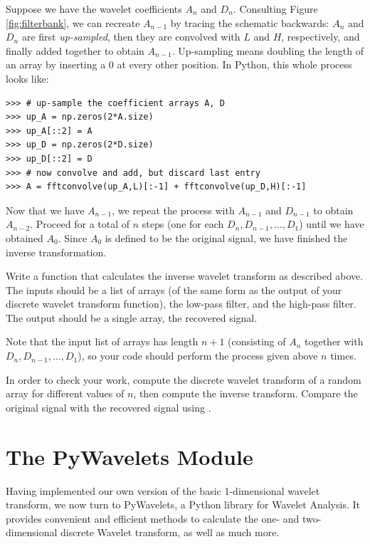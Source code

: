 Suppose we have the wavelet coefficients $A_n$ and $D_n$. Consulting Figure \ref{fig:filterbank},
we can recreate $A_{n-1}$ by tracing the schematic backwards: $A_n$ and $D_n$ are first
\emph{up-sampled}, then they are convolved with $L$ and $H$, respectively, and finally
added together to obtain $A_{n-1}$. Up-sampling means doubling the length of an array
by inserting a 0 at every other position. In Python, this whole process looks like:
\begin{lstlisting}
>>> # up-sample the coefficient arrays A, D
>>> up_A = np.zeros(2*A.size)
>>> up_A[::2] = A
>>> up_D = np.zeros(2*D.size)
>>> up_D[::2] = D
>>> # now convolve and add, but discard last entry
>>> A = fftconvolve(up_A,L)[:-1] + fftconvolve(up_D,H)[:-1]
\end{lstlisting}
Now that we have $A_{n-1}$, we repeat the process with $A_{n-1}$ and $D_{n-1}$ to obtain
$A_{n-2}$. Proceed for a total of $n$ steps (one for each $D_n, D_{n-1},\ldots ,D_1$) until we have obtained $A_0$.
Since $A_0$ is defined to be the original
signal, we have finished the inverse transformation.
\begin{problem}
Write a function that calculates the inverse wavelet transform as described above.
The inputs should be a list of arrays (of the same form as the output of your discrete
wavelet transform function), the low-pass filter, and the high-pass filter.
The output should be a single array, the recovered signal.

Note that the input list of arrays has length $n+1$ (consisting of $A_n$ together with
$D_n, D_{n-1}, \ldots, D_1$), so your code should perform the process given above $n$ times.

In order to check your work, compute
the discrete wavelet transform of a random array for different values of $n$, then compute the inverse
transform.
Compare the original signal with the recovered signal using .
\end{problem}
\section*{The PyWavelets Module}
Having implemented our own version of the basic 1-dimensional wavelet transform, we now turn to
PyWavelets, a Python library for Wavelet Analysis.
It provides convenient and efficient methods to calculate the one- and two-dimensional discrete Wavelet
transform, as well as much more.

